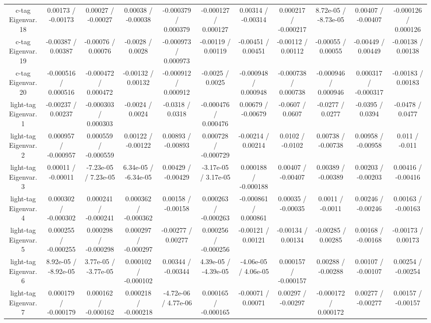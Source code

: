 \begin{table}[htbp]
\begin{center}
\begin{tabular}{|c|c|c|c|c|c|c|c|c|c|c|}
  c-tag Eigenvar. 18 & 0.00173 / -0.00173 & 0.00027 / -0.00027 & 0.00038 / -0.00038 & -0.000379 / 0.000379 & -0.000127 / 0.000127 & 0.00314 / -0.00314 & 0.000217 / -0.000217 & 8.72e-05 / -8.73e-05 & 0.00407 / -0.00407 & -0.000126 / 0.000126 \\ 
  c-tag Eigenvar. 19 & -0.00387 / 0.00387 & -0.00076 / 0.00076 & -0.0028 / 0.0028 & -0.000973 / 0.000973 & -0.00119 / 0.00119 & -0.00451 / 0.00451 & -0.00112 / 0.00112 & -0.00055 / 0.00055 & -0.00449 / 0.00449 & -0.00138 / 0.00138 \\ 
  c-tag Eigenvar. 20 & -0.000516 / 0.000516 & -0.000472 / 0.000472 & -0.00132 / 0.00132 & -0.000912 / 0.000912 & -0.0025 / 0.0025 & -0.000948 / 0.000948 & -0.000738 / 0.000738 & -0.000946 / 0.000946 & 0.000317 / -0.000317 & -0.00183 / 0.00183 \\ 
  light-tag Eigenvar. 1 & -0.00237 / 0.00237 & -0.000303 / 0.000303 & -0.0024 / 0.0024 & -0.0318 / 0.0318 & -0.000476 / 0.000476 & 0.00679 / -0.00679 & -0.0607 / 0.0607 & -0.0277 / 0.0277 & -0.0395 / 0.0394 & -0.0478 / 0.0477 \\ 
  light-tag Eigenvar. 2 & 0.000957 / -0.000957 & 0.000559 / -0.000559 & 0.00122 / -0.00122 & 0.00893 / -0.00893 & 0.000728 / -0.000729 & -0.00214 / 0.00214 & 0.0102 / -0.0102 & 0.00738 / -0.00738 & 0.00958 / -0.00958 & 0.011 / -0.011 \\ 
  light-tag Eigenvar. 3 & 0.00011 / -0.00011 & -7.23e-05 / 7.23e-05 & 6.34e-05 / -6.34e-05 & 0.00429 / -0.00429 & -3.17e-05 / 3.17e-05 & 0.000188 / -0.000188 & 0.00407 / -0.00407 & 0.00389 / -0.00389 & 0.00203 / -0.00203 & 0.00416 / -0.00416 \\ 
  light-tag Eigenvar. 4 & 0.000302 / -0.000302 & 0.000241 / -0.000241 & 0.000362 / -0.000362 & 0.00158 / -0.00158 & 0.000263 / -0.000263 & -0.000861 / 0.000861 & 0.00035 / -0.00035 & 0.0011 / -0.0011 & 0.00246 / -0.00246 & 0.00163 / -0.00163 \\ 
  light-tag Eigenvar. 5 & 0.000255 / -0.000255 & 0.000298 / -0.000298 & 0.000297 / -0.000297 & -0.00277 / 0.00277 & 0.000256 / -0.000256 & -0.00121 / 0.00121 & -0.00134 / 0.00134 & -0.00285 / 0.00285 & 0.00168 / -0.00168 & -0.00173 / 0.00173 \\ 
  light-tag Eigenvar. 6 & 8.92e-05 / -8.92e-05 & 3.77e-05 / -3.77e-05 & 0.000102 / -0.000102 & 0.00344 / -0.00344 & 4.39e-05 / -4.39e-05 & -4.06e-05 / 4.06e-05 & 0.000157 / -0.000157 & 0.00288 / -0.00288 & 0.00107 / -0.00107 & 0.00254 / -0.00254 \\ 
  light-tag Eigenvar. 7 & 0.000179 / -0.000179 & 0.000162 / -0.000162 & 0.000218 / -0.000218 & -4.72e-06 / 4.77e-06 & 0.000165 / -0.000165 & -0.00071 / 0.00071 & 0.00297 / -0.00297 & -0.000172 / 0.000172 & 0.00277 / -0.00277 & 0.00157 / -0.00157 \\ 

\end{tabular}
\end{center}
\end{table}
